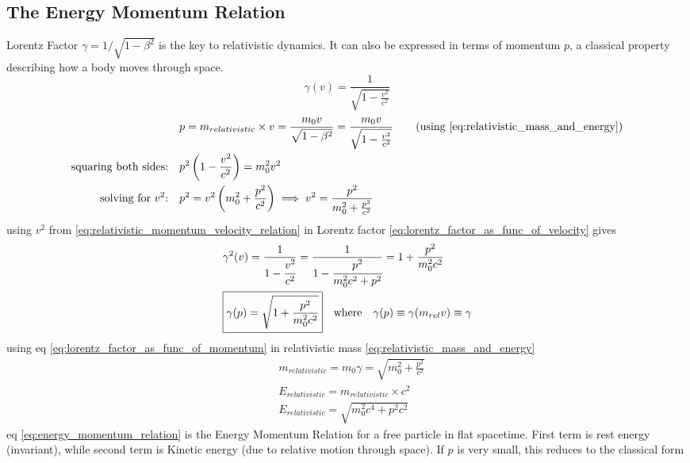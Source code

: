 \documentclass[11pt, a4paper]{article}
\newcommand{\eqrefnp}[1]{\textup{\ref{#1}}}
\begin{document}
\subsection{The Energy Momentum Relation}
Lorentz Factor $\gamma = 1/\sqrt{1 - \beta^{2}}$ is  the key to relativistic dynamics. It can also be expressed in terms of momentum $p$, a classical property describing how a body moves through space. \cite{forshaw2014relativity}
\begin{equation}\label{eq:lorentz_factor_as_func_of_velocity}
	\gamma(v) = \frac{1}{\sqrt{1 - \frac{v^{2}}{c^{2}}}}
\end{equation}
\begin{align}
	& p = m_{relativistic} \times v = \frac{m_{0}v}{\sqrt{1 - \beta^{2}}} = \frac{m_{0}v}{\sqrt{1 - \frac{v^{2}}{c^{2}}}} \nonumber \tag{using \eqrefnp{eq:relativistic_mass_and_energy}} \\
	\text{squaring both sides:} \quad & p^{2}\left(1 - \frac{v^{2}}{c^{2}} \right) = m_{0}^{2}v^{2} \nonumber \\
	\text{solving for $v^{2}$:} \quad & p^{2} = v^{2} \left(m_{0}^{2} + \frac{p^{2}}{c^{2}}\right) \implies v^{2} = \frac{p^{2}}{m_{0}^{2} + \frac{p^{2}}{c^{2}}} \label{eq:relativistic_momentum_velocity_relation}
\end{align}
using $v^{2}$ from \eqref{eq:relativistic_momentum_velocity_relation} in Lorentz factor \eqref{eq:lorentz_factor_as_func_of_velocity} gives
\begin{align}
	& \gamma^{2}(v) = \frac{1}{1 - \cfrac{v^{2}}{c^{2}}} = \frac{1}{1 - \cfrac{p^{2}}{m_{0}^{2}c^{2} + p^{2}}} = 1 + \frac{p^{2}}{m_{0}^{2}c^{2}} \nonumber  \\
	& \boxed{\gamma(p) = \sqrt{1 + \frac{p^{2}}{m_{0}^{2}c^{2}}}} \quad \text{where} \quad \gamma(p) \equiv \gamma(m_{rel}v) \equiv \gamma \label{eq:lorentz_factor_as_func_of_momentum}
\end{align}
using eq \eqref{eq:lorentz_factor_as_func_of_momentum} in relativistic mass \eqref{eq:relativistic_mass_and_energy}
\begin{align}
	& m_{relativistic} = m_{0} \gamma = \sqrt{m_{0}^{2} + \frac{p^{2}}{c^{2}}} \nonumber \\
	& E_{relativistic} = m_{relativistic} \times c^{2}\nonumber \\
	& \boxed{E_{relativistic} = \sqrt{m_{0}^{2}c^{4} + p^{2}c^{2}}} \label{eq:energy_momentum_relation}
\end{align}
eq \eqref{eq:energy_momentum_relation} is the Energy Momentum Relation for a free particle in flat spacetime. First term is rest energy (invariant), while second term is Kinetic energy (due to relative motion through space). If $p$ is very small, this reduces to the classical form
\end{document}
